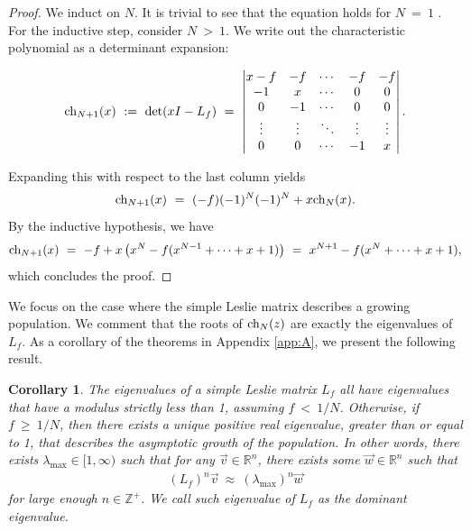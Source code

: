 \documentclass[11pt,reqno]{amsart}
\numberwithin{equation}{section}
\theoremstyle{plain}
\newtheorem{corollary}[thm]{Corollary}
\newcommand{\ch}{\textnormal{ch}}
\begin{document}
\begin{proof} We induct on $N$. It is trivial to see that the equation holds for 
$N \ = \  1$ 
. For the inductive step, consider $N \ > \  1$. We write out the 
characteristic polynomial as a determinant expansion:

\[
    \ch_{N + 1}(x) \ := \ \textrm{det}(xI - L_f) 
    \ = \ 
    \begin{vmatrix}
        x - f & -f& \cdots & -f & -f \\ 
        -1 & x & \cdots & 0& 0 \\
        0 & -1 & \cdots & 0 & 0\\
        \vdots & \vdots &\ddots & \vdots & \vdots\\
        0 & 0 & \cdots & -1 & x
    \end{vmatrix} . 
\]

Expanding this with respect to the last column yields
\[
    \ch_{N + 1}(x) \ = \ 
    (-f)(-1)^N(-1)^N + x\ch_{N}(x). 
\]
By the inductive hypothesis, we have
\[
    \ch_{N + 1}(x) \ = \ 
    -f + x\left(
    x^N - f(x^{N-1} + \cdots + x + 1)
    \right)
    \ = \ 
x^{N + 1} - f(x^{N} + \cdots + x + 1),
\]
which concludes the proof. 
\end{proof}

We focus on the case where the simple Leslie matrix describes a growing population. We comment that the roots of $\ch_N(z)$ are exactly the 
eigenvalues of $L_f$. As a corollary of the theorems in Appendix \ref{app:A}, we present the following result. 


\begin{corollary}
    The eigenvalues of a simple Leslie matrix $L_f$ all 
    have eigenvalues that have a modulus strictly less than 1, assuming $f \ < \ 1/N$. Otherwise, if $f \ \geq \ 1/N$, then there exists a unique positive real eigenvalue, greater than or equal to 1, that describes the asymptotic growth of the population. 
    In other words, there exists $\lambda_{\max} \in [1, \infty) $ such that for any $\vec v \in \mathbb R^n$, there exists some $\vec w \in \mathbb R^n$ such that 
    \begin{align}
        (L_f)^n \vec v \ \approx \ (\lambda_{\max})^n \vec w
    \end{align}
    for large enough $n \in \mathbb Z^+$. 
    We call such eigenvalue of $L_f$ as the dominant eigenvalue. 
\end{corollary}
\end{document}
